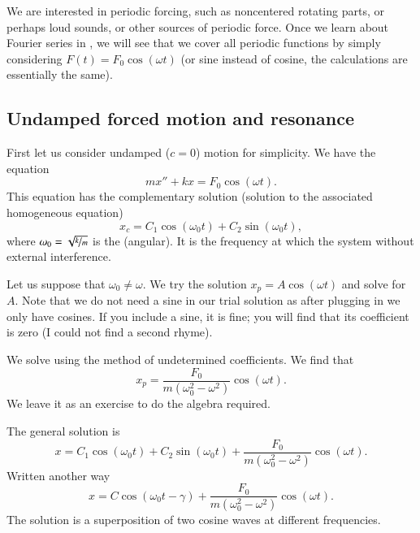 \documentclass[12pt]{book}
\begin{document}
We are interested in periodic
forcing, such as noncentered rotating parts, or perhaps loud sounds, or
other sources of periodic force.  Once we learn about Fourier series in
, we
will see that we cover all periodic functions
by simply considering $F(t) = F_0 \cos (\omega t)$ (or sine instead of cosine,
the calculations are essentially the same).

\subsection{Undamped forced motion and resonance}

First let us consider undamped ($c=0$) motion for simplicity.
We have the equation
\begin{equation*}
mx'' + kx = F_0 \cos (\omega t) .
\end{equation*}
This equation has the complementary solution (solution to the associated homogeneous
equation)
\begin{equation*}
x_c = C_1 \cos (\omega_0 t) + C_2 \sin (\omega_0 t) ,
\end{equation*}
where $\omega_0 = \sqrt{\nicefrac{k}{m}}$ is the
\emph{} (angular).  It is the frequency
at which the system  without external interference.

Let us suppose that $\omega_0 \not= \omega$.  We try the solution
$x_p = A \cos (\omega t)$ and solve for $A$.  Note that we do not need a sine
in our trial solution as after plugging in we only have cosines.
If you include a sine, it is fine; you will find that its
coefficient is zero (I could not find a second rhyme).

We solve using the method of undetermined coefficients.  We find that
\begin{equation*}
x_p = \frac{F_0}{m(\omega_0^2 - \omega^2)} \cos (\omega t) .
\end{equation*}
We leave it as an exercise to do the algebra required.

The general solution is
\begin{equation*}
\boxed{
~~
x = C_1 \cos (\omega_0 t) + C_2 \sin (\omega_0 t) +
\frac{F_0}{m(\omega_0^2 - \omega^2)} \cos (\omega t) .
~~
}
\end{equation*}
Written another way
\begin{equation*}
x = C \cos (\omega_0 t - \gamma) +
\frac{F_0}{m(\omega_0^2 - \omega^2)} \cos (\omega t) .
\end{equation*}
The solution is a superposition of two cosine waves at different frequencies.
\end{document}
